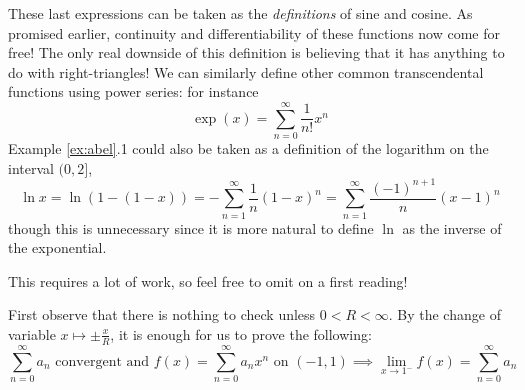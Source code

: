 \label{pg:expseriesdefn}
These last expressions can be taken as the \emph{definitions} of sine and cosine. As promised earlier, continuity and differentiability of these functions now come for free! The only real downside of this definition is believing that it has anything to do with right-triangles!\smallbreak
We can similarly define other common transcendental functions using power series: for instance
\[
	\exp(x)=\sum\limits_{n=0}^\infty \frac 1{n!}x^n %
\]
Example \ref{ex:abel}.1 could also be taken as a definition of the logarithm on the interval $(0,2]$, 
\[
	\ln x=\ln(1-(1-x))=-\sum_{n=1}^\infty \frac 1n(1-x)^n 
	=\sum_{n=1}^\infty \frac{(-1)^{n+1}}n(x-1)^n
\]
though this is unnecessary since it is more natural to define $\ln$ as the inverse of the exponential.


\goodbreak



This requires a lot of work, so feel free to omit on a first reading!\bigbreak

First observe that there is nothing to check unless $0<R<\infty$. By the change of variable $x\mapsto \pm\frac xR$, it is enough for us to prove the following:
\[
	\sum\limits_{n=0}^\infty a_n\text{ convergent and } 
	f(x)=\sum\limits_{n=0}^\infty a_nx^n\text{ on }(-1,1)
	\implies\lim\limits_{x\to 1^-}f(x)=\sum\limits_{n=0}^\infty a_n
\]

